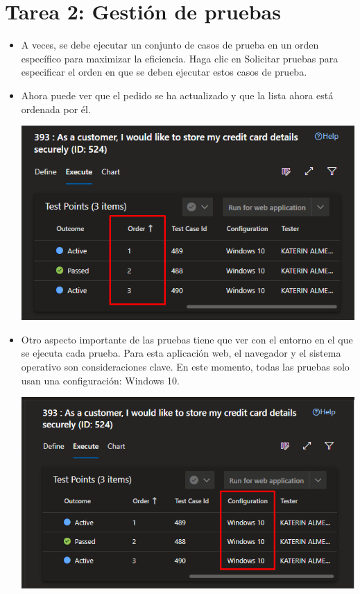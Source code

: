 \section{Tarea 2: Gestión de pruebas} 
\begin{itemize}
\item A veces, se debe ejecutar un conjunto de casos de prueba en un orden específico para maximizar la eficiencia. Haga clic en Solicitar pruebas para especificar el orden en que se deben ejecutar estos casos de prueba.
\item Ahora puede ver que el pedido se ha actualizado y que la lista ahora está ordenada por él.
\begin{center}
\includegraphics[width=\columnwidth]{images/29}\newline
\end{center}

\item Otro aspecto importante de las pruebas tiene que ver con el entorno en el que se ejecuta cada prueba. Para esta aplicación web, el navegador y el sistema operativo son consideraciones clave. En este momento, todas las pruebas solo usan una configuración: Windows 10.
\begin{center}
\includegraphics[width=\columnwidth]{images/30}\newline
\end{center}


\end{itemize}
